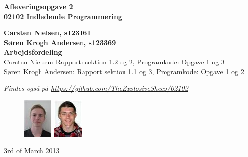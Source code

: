 \thispagestyle{empty} %
\begin{center}
\textbf{\Huge {Afleveringsopgave 2}\\ \vspace{1cm}
\huge{02102 Indledende Programmering}}
\end{center}
\vspace{1cm}
\begin{center}
\Large{\textbf{Carsten Nielsen, s123161 \\ Søren Krogh Andersen, s123369}} \\
\vspace{1cm}
\Large{\textbf{Arbejdsfordeling}} \\
Carsten Nielsen: Rapport: sektion 1.2 og 2, Programkode: Opgave 1 og 3 \\
Søren Krogh Andersen: Rapport sektion 1.1 og 3, Programkode: Opgave 1 og 2

\emph{Findes også på \url{https://github.com/TheExplosiveSheep/02102}}
\end{center}
\vspace{6cm}
\begin{figure}[h]
\hfill
\includegraphics{pictures/s123161.png}%
\includegraphics{pictures/s123369.png}%
\end{figure}
3rd of March 2013

\thispagestyle{empty}
